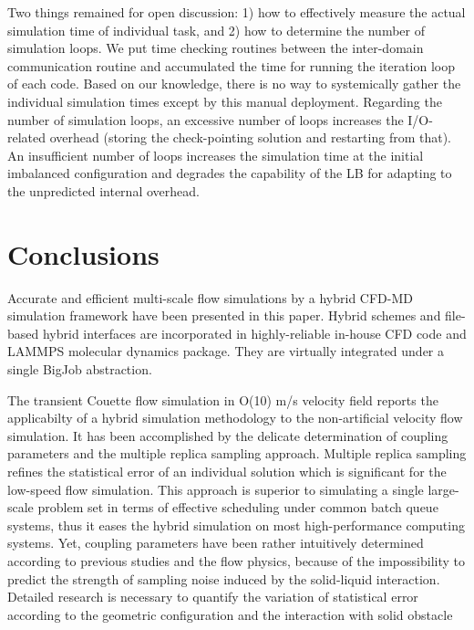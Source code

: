 \documentclass[preprint,12pt]{elsarticle}
\begin{document}
Two things remained for open discussion: 1) how to effectively measure the actual simulation time of individual task, and 2) how to determine the number of simulation loops. We put time checking routines between the inter-domain communication routine and accumulated the time for running the iteration loop of each code. Based on our knowledge, there is no way to systemically gather the individual simulation times except by this manual deployment. Regarding the number of simulation loops, an excessive number of loops increases the I/O-related overhead (storing the check-pointing solution and restarting from that). An insufficient number of loops increases the simulation time at the initial imbalanced configuration and degrades the capability of the LB for adapting to the unpredicted internal overhead.


\section{Conclusions}
\label{sec:conclusion}

Accurate and efficient multi-scale flow simulations by a hybrid CFD-MD
simulation framework have been presented in this paper.
Hybrid schemes and file-based hybrid interfaces are incorporated
in highly-reliable in-house CFD code and LAMMPS molecular dynamics package.
They are virtually integrated under a single BigJob abstraction.

The transient Couette flow simulation in O(10) m/s velocity field reports
the applicabilty of a hybrid simulation methodology to
the non-artificial velocity flow simulation.
It has been accomplished by the delicate determination of
coupling parameters and the multiple replica sampling approach.
Multiple replica sampling refines the statistical error
of an individual solution which is significant for the low-speed flow simulation.
This approach is superior to simulating a single large-scale problem set
in terms of effective scheduling under common batch queue systems, thus
it eases the hybrid simulation on most high-performance computing systems.
Yet, coupling parameters have been rather intuitively determined
according to previous studies and the flow physics, because of
the impossibility to predict the strength of sampling noise
induced by the solid-liquid interaction.
Detailed research is necessary to quantify the variation of
statistical error according to the geometric configuration
and the interaction with solid obstacle 
\end{document}
